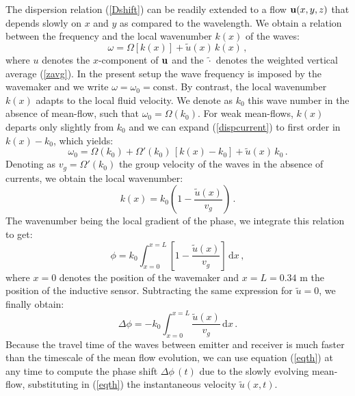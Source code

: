 \documentclass[doublecol]{epl2} %
\begin{document}
The dispersion relation (\ref{Dshift}) can be readily extended to a flow ${\bf u}(x,y,z)$ that depends slowly on $x$ and $y$ as compared to the wavelength. We obtain a relation between the frequency and the local wavenumber $k(x)$ of the waves:
\begin{equation}
\omega= \Omega[k(x)] + \tilde{u}(x) \, k(x) \, , \label{dispcurrent}
\end{equation}
where $u$ denotes the $x$-component of ${\bf u}$ and the $\tilde{\cdot}$ denotes the weighted vertical average (\ref{zavg}).
In the present setup the wave frequency is imposed by the wavemaker and we write $\omega=\omega_0=\text{const}$. By contrast, the local wavenumber $k(x)$ adapts to the local fluid velocity. We denote as $k_0$ this wave number in the absence of mean-flow, such that $\omega_0=\Omega(k_0)$. For weak mean-flows, $k(x)$ departs only slightly from $k_0$ and we can expand  (\ref{dispcurrent}) to first order in $k(x)-k_0$, which yields:
\begin{equation}
\omega_0= \Omega(k_0) + \Omega'(k_0)\,[k(x)-k_0] + \tilde{u}(x) \, k_0 \, . 
\end{equation}
Denoting as $v_g=\Omega'(k_0)$ the group velocity of the waves in the absence of currents, we obtain the local wavenumber:
\begin{equation}
k(x)= k_0 \left( 1 - \frac{\tilde{u}(x)}{v_g} \right) \, .
\end{equation}
The wavenumber being the local gradient of the phase, we integrate this relation to get:
\begin{equation}
\phi=k_0 \int_{x=0}^{x=L} \left[1 - \frac{\tilde{u}(x)}{v_g} \right] \, \mathrm{d}x \, ,
\end{equation}
where $x=0$ denotes the position of the wavemaker and $x=L=0.34$ m the position of the inductive sensor. Subtracting the same expression for $\tilde{u}=0$, we finally obtain:
\begin{equation}
\Delta \phi= - k_0 \int_{x=0}^{x=L} \frac{\tilde{u}(x)}{v_g}  \, \mathrm{d}x \, . \label{eqth}
\end{equation}
Because the travel time of the waves between emitter and receiver is much faster than the timescale of the mean flow evolution, we can use equation (\ref{eqth}) at any time to compute the phase shift $\Delta \phi \, (t)$ due to the slowly evolving mean-flow, substituting in (\ref{eqth}) the instantaneous velocity $\tilde{u}(x,t)$.
\end{document}
